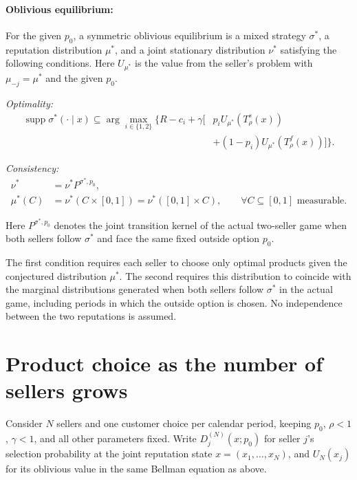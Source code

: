 \documentclass[11pt]{article}
\begin{document}
\paragraph{Oblivious equilibrium:}
For the given $p_0$, a symmetric oblivious equilibrium is a mixed strategy $\sigma^*$,
a reputation distribution $\mu^*$, and a joint stationary
distribution $\nu^*$ satisfying the following conditions.
Here $U_{\mu^*}$ is the value from the seller's problem with
$\mu_{-j}=\mu^*$ and the given $p_0$.

\textit{Optimality:}
\begin{equation}
\begin{aligned}
\operatorname{supp}\sigma^*(\cdot\mid x)
\subseteq
\arg\max_{i\in\{1,2\}}
\Big\{
R-c_i
+\gamma\big[
&p_iU_{\mu^*}(T_\rho^s(x))\\
&+(1-p_i)U_{\mu^*}(T_\rho^f(x))
\big]
\Big\}.
\end{aligned}
\end{equation}

\textit{Consistency:}
\begin{equation}
\begin{aligned}
\nu^*&=\nu^*P^{\sigma^*,p_0},\\
\mu^*(C)&=\nu^*(C\times[0,1])
=\nu^*([0,1]\times C),
\qquad \forall C\subseteq[0,1]
\text{ measurable}.
\end{aligned}
\end{equation}

Here $P^{\sigma^*,p_0}$ denotes the joint transition kernel
of the actual two-seller game when both sellers follow
$\sigma^*$ and face the same fixed outside option $p_0$.

The first condition requires each seller to choose only
optimal products given the conjectured distribution $\mu^*$.
The second requires this distribution to coincide with the
marginal distributions generated when both sellers follow
$\sigma^*$ in the actual game, including periods in which the outside
option is chosen. No independence between the two reputations is assumed.

\section{Product choice as the number of sellers grows}

Consider $N$ sellers and one customer choice per calendar period,
keeping $p_0$, $\rho<1$,
$\gamma<1$, and all other parameters fixed. Write
$D_j^{(N)}(x;p_0)$ for seller $j$'s selection probability at the joint
reputation state $x=(x_1,\ldots,x_N)$, and $U_N(x_j)$ for its oblivious
value in the same Bellman equation as above.
\end{document}
